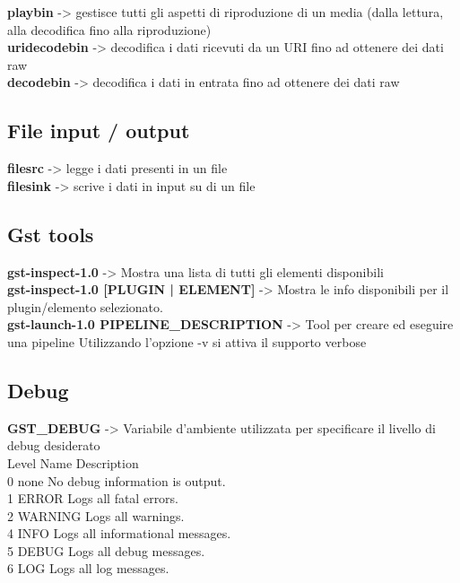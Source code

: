 \documentclass[8pt,a4paper]{article}
\begin{document}
\begin{multicols}{5}
    \textbf{playbin} -> gestisce tutti gli aspetti di riproduzione di un media (dalla lettura, alla decodifica fino alla riproduzione)\\
    \textbf{uridecodebin} -> decodifica i dati ricevuti da un URI fino ad ottenere dei dati raw\\
    \textbf{decodebin} -> decodifica i dati in entrata fino ad ottenere dei dati raw
    
    \subsection{File input / output}
    
    \textbf{filesrc} -> legge i dati presenti in un file\\
    \textbf{filesink} -> scrive i dati in input su di un file\\

    \subsection{Gst tools} 

    \textbf{gst-inspect-1.0} -> Mostra una lista di tutti gli elementi disponibili\\
    
    \textbf{gst-inspect-1.0 [PLUGIN | ELEMENT]} -> Mostra le info disponibili per il plugin/elemento selezionato.\\
    
    \textbf{gst-launch-1.0 PIPELINE\_DESCRIPTION} -> Tool per creare ed eseguire una pipeline
    Utilizzando l’opzione -v si attiva il supporto verbose\\
    
    \subsection{Debug} 
    
    \textbf{GST\_DEBUG} -> Variabile d’ambiente utilizzata per specificare il livello di debug desiderato\\
    
    Level 	Name 	Description\\
    0       none	No debug information is output.\\
    1       ERROR Logs all fatal errors.\\
    2       WARNING Logs all warnings.\\
    4       INFO 	Logs all informational messages.\\
    5       DEBUG Logs all debug messages.\\
    6       LOG   Logs all log messages.\\
    

\end{multicols}
\end{document}
